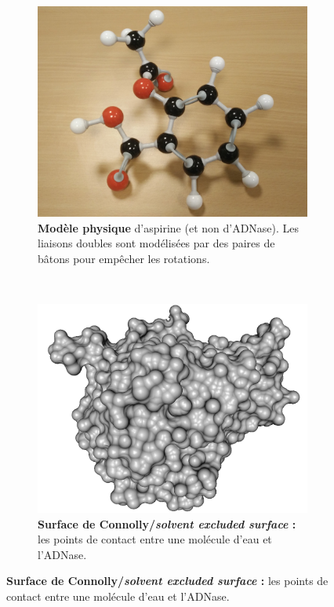 \begin{figure}[htb]
\begin{subfigure}[t]{\subImgW}
			\centering
			\includegraphics[width=\textwidth]{./figures/ch1/aspirin}
			\caption[Modèle physique de l'aspirine]{\textbf{Modèle physique }d'aspirine (et non d'ADNase). Les liaisons doubles sont modélisées par des paires de bâtons pour empêcher les rotations.}
			\label{fig:aspirin}
		\end{subfigure}
		~
		\begin{subfigure}[t]{\subImgW}
			\centering
			\includegraphics[width=\textwidth]{./figures/ch1/4awn_ses}
			\caption[Représentation en surface de Connolly]{\textbf{Surface de Connolly/\emph{solvent excluded surface} :} les points de contact entre une molécule d'eau et l'ADNase.}
			\label{fig:4awn_ses}

\end{subfigure}
\end{figure}
